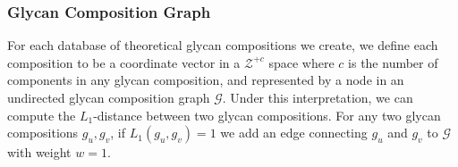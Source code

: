     \subsubsection{Glycan Composition Graph}
        For each database of theoretical glycan compositions we create, we
        define each composition to be a coordinate vector in a $\mathcal{Z}^{+c}$
        space where $c$ is the number of components in any glycan composition,
        and represented by a node in an undirected glycan composition
        graph $\mathcal{G}$. Under this interpretation, we can compute the
        $L_1$-distance between two glycan compositions. For any two glycan
        compositions $g_u, g_v$, if $L_1(g_u, g_v) = 1$ we add an edge
        connecting $g_u$ and $g_v$ to $\mathcal{G}$ with weight $w = 1$.
